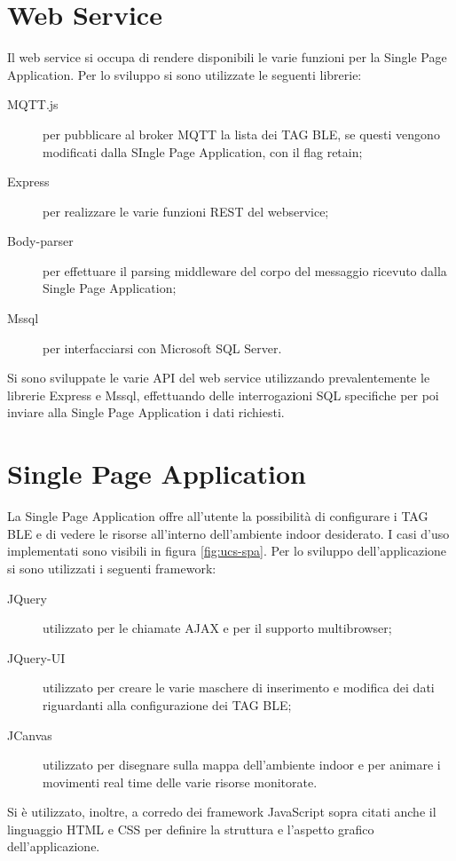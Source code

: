 \section{Web Service}
Il web service si occupa di rendere disponibili le varie funzioni per la Single Page Application. Per lo sviluppo si sono utilizzate le seguenti librerie:
\begin{description}
	
	\item[MQTT.js] per pubblicare al broker MQTT la lista dei TAG BLE, se questi vengono modificati dalla SIngle Page Application, con il flag retain;
	
	\item[Express] per realizzare le varie funzioni REST del webservice;
	
	\item[Body-parser] per effettuare il parsing middleware del corpo del messaggio ricevuto dalla Single Page Application;
	
	\item[Mssql] per interfacciarsi con Microsoft SQL Server.
	
\end{description}
Si sono sviluppate le varie API del web service utilizzando prevalentemente le librerie Express e Mssql, effettuando delle interrogazioni SQL specifiche per poi inviare alla Single Page Application i dati richiesti.


\section{Single Page Application}
La Single Page Application offre all'utente la possibilità di configurare i TAG BLE e di vedere le risorse all'interno dell'ambiente indoor desiderato.
I casi d'uso implementati sono visibili in figura \ref{fig:ucs-spa}.
Per lo sviluppo dell'applicazione si sono utilizzati i seguenti framework:
\begin{description}
	
	\item[JQuery] utilizzato per le chiamate AJAX e per il supporto multibrowser;
	
	\item[JQuery-UI] utilizzato per creare le varie maschere di inserimento e modifica dei dati riguardanti alla configurazione dei TAG BLE;
	
	\item[JCanvas] utilizzato per disegnare sulla mappa dell’ambiente indoor e per animare i movimenti real time delle varie risorse monitorate.
	
\end{description}
Si è utilizzato, inoltre, a corredo dei framework JavaScript sopra citati anche il linguaggio HTML e CSS per definire la struttura e l’aspetto grafico dell'applicazione.

